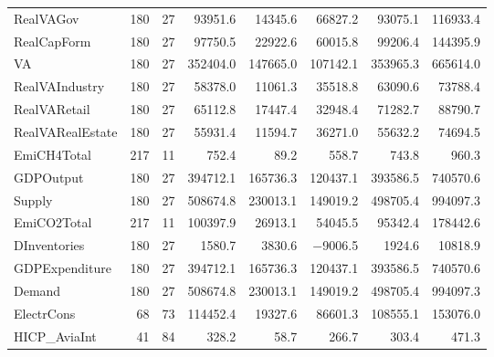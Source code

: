 {\begin{tabular}[t]{lrrrrrrr}
RealVAGov & 180 & 27 & \num{93951.6} & \num{14345.6} & \num{66827.2} & \num{93075.1} & \num{116933.4}\\
RealCapForm & 180 & 27 & \num{97750.5} & \num{22922.6} & \num{60015.8} & \num{99206.4} & \num{144395.9}\\
VA & 180 & 27 & \num{352404.0} & \num{147665.0} & \num{107142.1} & \num{353965.3} & \num{665614.0}\\
RealVAIndustry & 180 & 27 & \num{58378.0} & \num{11061.3} & \num{35518.8} & \num{63090.6} & \num{73788.4}\\
RealVARetail & 180 & 27 & \num{65112.8} & \num{17447.4} & \num{32948.4} & \num{71282.7} & \num{88790.7}\\
RealVARealEstate & 180 & 27 & \num{55931.4} & \num{11594.7} & \num{36271.0} & \num{55632.2} & \num{74694.5}\\
EmiCH4Total & 217 & 11 & \num{752.4} & \num{89.2} & \num{558.7} & \num{743.8} & \num{960.3}\\
GDPOutput & 180 & 27 & \num{394712.1} & \num{165736.3} & \num{120437.1} & \num{393586.5} & \num{740570.6}\\
Supply & 180 & 27 & \num{508674.8} & \num{230013.1} & \num{149019.2} & \num{498705.4} & \num{994097.3}\\
EmiCO2Total & 217 & 11 & \num{100397.9} & \num{26913.1} & \num{54045.5} & \num{95342.4} & \num{178442.6}\\
DInventories & 180 & 27 & \num{1580.7} & \num{3830.6} & \num{-9006.5} & \num{1924.6} & \num{10818.9}\\
GDPExpenditure & 180 & 27 & \num{394712.1} & \num{165736.3} & \num{120437.1} & \num{393586.5} & \num{740570.6}\\
Demand & 180 & 27 & \num{508674.8} & \num{230013.1} & \num{149019.2} & \num{498705.4} & \num{994097.3}\\
ElectrCons & 68 & 73 & \num{114452.4} & \num{19327.6} & \num{86601.3} & \num{108555.1} & \num{153076.0}\\
HICP\_AviaInt & 41 & 84 & \num{328.2} & \num{58.7} & \num{266.7} & \num{303.4} & \num{471.3}\\
\bottomrule
\end{tabular}}
